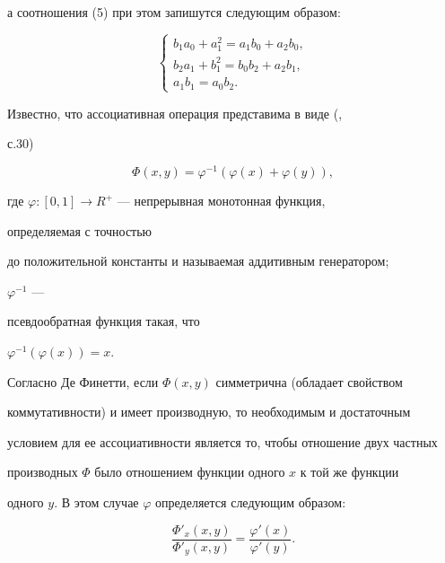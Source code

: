 а соотношения (5) при этом запишутся следующим образом:


$$


\begin{cases}


b_1a_0+a^2_1=a_1b_0+a_2b_0,\\


b_2a_1+b^2_1=b_0b_2+a_2b_1,\\


a_1b_1=a_0b_2.


\end{cases}


$$





Известно, что ассоциативная операция представима в виде (\cite{Pos},


с.30)


$$


\Phi(x,y)=\varphi^{-1}(\varphi(x)+\varphi(y)),


$$


где $\varphi:[0,1]\to R^+$ --- непрерывная монотонная функция,


определяемая с точностью


до положительной константы и называемая аддитивным генератором;


$\varphi^{-1}$ ---


псевдообратная функция такая, что


$\varphi^{-1}(\varphi(x))=x$.





Согласно Де Финетти, если $\Phi(x,y)$ симметрична (обладает свойством


коммутативности) и имеет производную, то необходимым и достаточным


условием для ее ассоциативности является то, чтобы отношение двух частных


производных $\Phi$ было отношением функции одного $x$ к той же функции


одного $y$. В этом случае $\varphi$ определяется следующим образом:


\begin{equation}


\frac{\Phi'_x(x,y)}{\Phi'_y(x,y)}=


\frac{\varphi'(x)}{\varphi'(y)}.


\end{equation}





